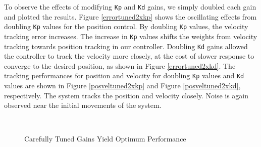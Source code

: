 \documentclass[letter, 10pt]{article}
\begin{document}
\begin{onehalfspacing}
To observe the effects of modifying {\tt Kp} and {\tt Kd} gains, we simply doubled each gain and plotted
the results. Figure \ref{errortuned2xkp} shows the oscillating effects from doubling {\tt Kp} values
for the position control. By doubling {\tt Kp} values, the velocity tracking error increases.
The increase in {\tt Kp} values shifts the weights from velocity tracking towards position tracking
in our controller. Doubling {\tt Kd} gains allowed the controller to track the velocity more closely,
at the cost of slower response to converge to the desired position, as shown in Figure \ref{errortuned2xkd}.
The tracking performances for position and velocity for doubling {\tt Kp} values and {\tt Kd} values are
shown in Figure \ref{posveltuned2xkp} and Figure \ref{posveltuned2xkd}, respectively. The system tracks the position and velocity closely.
Noise is again observed near the initial movements of the system.

\begin{figure}[h!]
	\centering
		 \\
	\caption{Carefully Tuned Gains Yield Optimum Performance}
\end{figure}



\end{onehalfspacing}
\end{document}

